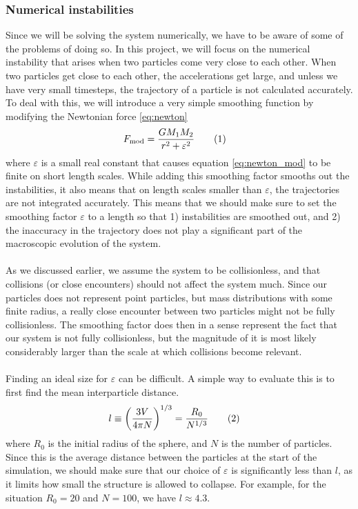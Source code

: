 \documentclass{article}
\newcommand\numberthis{\addtocounter{equation}{1}\tag{\theequation}}
\begin{document}
\subsubsection{Numerical instabilities}
Since we will be solving the system numerically, we have to be aware of some of the problems of doing so. In this project, we will focus on the numerical instability that arises when two particles come very close to each other. When two particles get close to each other, the accelerations get large, and unless we have very small timesteps, the trajectory of a particle is not calculated accurately. To deal with this, we will introduce a very simple smoothing function by modifying the Newtonian force \eqref{eq:newton}
\begin{align*}
  F_{\text{mod}} &= \frac{GM_1M_2}{r^2 + \varepsilon^2} \numberthis\label{eq:newton_mod}
\end{align*}
where $\varepsilon$ is a small real constant that causes equation \eqref{eq:newton_mod} to be finite on short length scales. While adding this smoothing factor smooths out the instabilities, it also means that on length scales smaller than $\varepsilon$, the trajectories are not integrated accurately. This means that we should make sure to set the smoothing factor $\varepsilon$ to a length so that 1) instabilities are smoothed out, and 2) the inaccuracy in the trajectory does not play a significant part of the macroscopic evolution of the system.\\\\
As we discussed earlier, we assume the system to be collisionless, and that collisions (or close encounters) should not affect the system much. Since our particles does not represent point particles, but mass distributions with some finite radius, a really close encounter between two particles might not be fully collisionless. The smoothing factor does then in a sense represent the fact that our system is not fully collisionless, but the magnitude of it is most likely considerably larger than the scale at which collisions become relevant.\\\\
Finding an ideal size for $\varepsilon$ can be difficult. A simple way to evaluate this is to first find the mean interparticle distance. \cite{JoyceFull}
\begin{align*}
  l &\equiv \bigg(\frac{3V}{4\pi N}\bigg)^{1/3} = \frac{R_0}{N^{1/3}} \numberthis\label{eq:mean_dist}
\end{align*}
where $R_0$ is the initial radius of the sphere, and $N$ is the number of particles. Since this is the average distance between the particles at the start of the simulation, we should make sure that our choice of $\varepsilon$ is significantly less than $l$, as it limits how small the structure is allowed to collapse. For example, for the situation $R_0 = 20$ and $N = 100$, we have $l \approx 4.3$.
\end{document}
